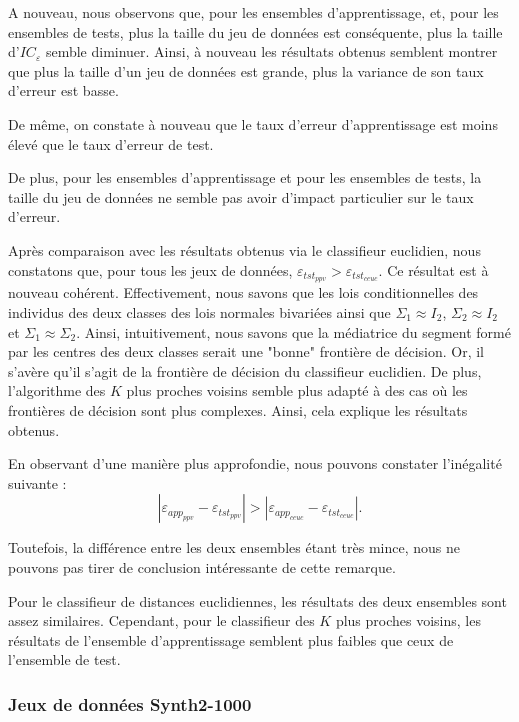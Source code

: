 \documentclass{article}
\begin{document}
\begin{multicols}{2}
A nouveau, nous observons que, pour les ensembles d'apprentissage, et, pour les ensembles de tests, plus la taille du jeu de données est conséquente, plus la taille d'$IC_\varepsilon$ semble diminuer. Ainsi, à nouveau les résultats obtenus semblent montrer que plus la taille d'un jeu de données est grande, plus la variance de son taux d'erreur est basse. 

De même, on constate à nouveau que le taux d'erreur d'apprentissage est moins élevé que le taux d'erreur de test.

De plus, pour les ensembles d'apprentissage et pour les ensembles de tests, la taille du jeu de données ne semble pas avoir d'impact particulier sur le taux d'erreur. 

Après comparaison avec les résultats obtenus via le classifieur euclidien, nous constatons que, pour tous les jeux de données, $\varepsilon_{tst_{ppv}} > \varepsilon_{tst_{ceuc}}.$ Ce résultat est à nouveau cohérent. Effectivement, nous savons que les lois conditionnelles des individus des deux classes des lois normales bivariées ainsi que $\Sigma_1 \approx I_2$, $\Sigma_2 \approx I_2$ et $\Sigma_1 \approx \Sigma_2.$ Ainsi, intuitivement, nous savons que la médiatrice du segment formé par les centres des deux classes serait une "bonne" frontière de décision. Or, il s'avère qu'il s'agit de la frontière de décision du classifieur euclidien. De plus, l'algorithme des $K$ plus proches voisins semble plus adapté à des cas où les frontières de décision sont plus complexes. Ainsi, cela explique les résultats obtenus. 

En observant d'une manière plus approfondie, nous pouvons constater l'inégalité suivante :
\[
|\varepsilon_{app_{ppv}} - \varepsilon_{tst_{ppv}}| > |\varepsilon_{app_{ceuc}} - \varepsilon_{tst_{ceuc}}|.
\]

Toutefois, la différence entre les deux ensembles étant très mince, nous ne pouvons pas tirer de conclusion intéressante de cette remarque.

Pour le classifieur de distances euclidiennes, les résultats des deux ensembles sont assez similaires. Cependant, pour le classifieur des $K$ plus proches voisins, les résultats de l’ensemble d’apprentissage semblent plus faibles que ceux de l’ensemble de test. 

\subsubsection{Jeux de données Synth2-1000}
\label{subsubsec_dataset_2}


\end{multicols}
\end{document}
